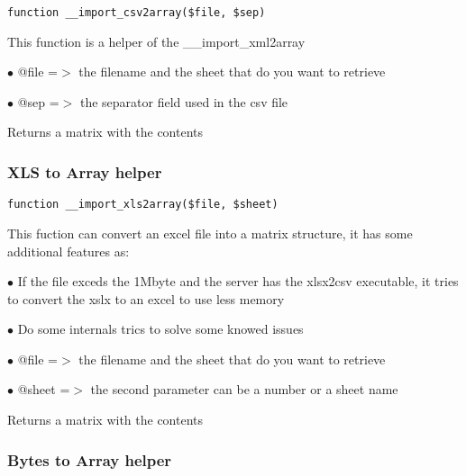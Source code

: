 \documentclass[a4paper]{article}
\begin{document}
\begin{lstlisting}
function __import_csv2array($file, $sep)
\end{lstlisting}

This function is a helper of the \_\_import\_xml2array

\begin{compactitem}
\item[\color{myblue}$\bullet$] @file =$>$ the filename and the sheet that do you want to retrieve
\item[\color{myblue}$\bullet$] @sep  =$>$ the separator field used in the csv file
\end{compactitem}

Returns a matrix with the contents

\hypertarget{toc467}{}
\subsubsection{XLS to Array helper}

\begin{lstlisting}
function __import_xls2array($file, $sheet)
\end{lstlisting}

This fuction can convert an excel file into a matrix structure, it has some additional features as:

\begin{compactitem}
\item[\color{myblue}$\bullet$] If the file exceds the 1Mbyte and the server has the xlsx2csv executable, it tries to convert the xslx
  to an excel to use less memory
\item[\color{myblue}$\bullet$] Do some internals trics to solve some knowed issues
\end{compactitem}

\begin{compactitem}
\item[\color{myblue}$\bullet$] @file  =$>$ the filename and the sheet that do you want to retrieve
\item[\color{myblue}$\bullet$] @sheet =$>$ the second parameter can be a number or a sheet name
\end{compactitem}

Returns a matrix with the contents

\hypertarget{toc468}{}
\subsubsection{Bytes to Array helper}
\end{document}
